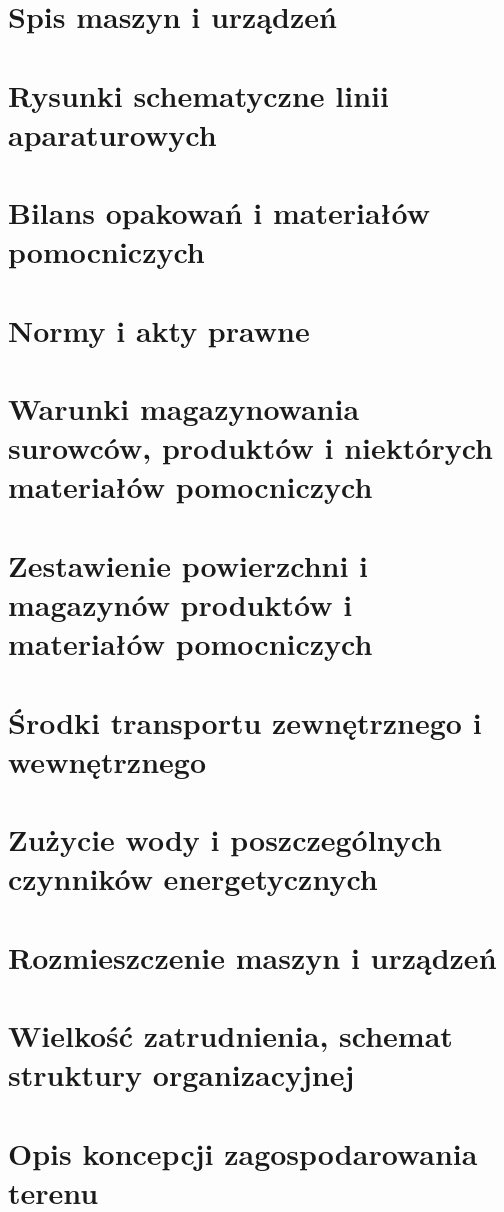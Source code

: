 \documentclass{article}
\begin{document}
\section{Spis maszyn i urządzeń}

\section{Rysunki schematyczne linii aparaturowych}

\section{Bilans opakowań i materiałów pomocniczych}

\section{Normy i akty prawne}

\section{Warunki magazynowania surowców, produktów i niektórych materiałów pomocniczych}

\section{Zestawienie powierzchni i magazynów produktów i materiałów pomocniczych}

\section{Środki transportu zewnętrznego i wewnętrznego}

\section{Zużycie wody i poszczególnych czynników energetycznych}

\section{Rozmieszczenie maszyn i urządzeń}

\section{Wielkość zatrudnienia, schemat struktury organizacyjnej}

\section{Opis koncepcji zagospodarowania terenu}
\end{document}
